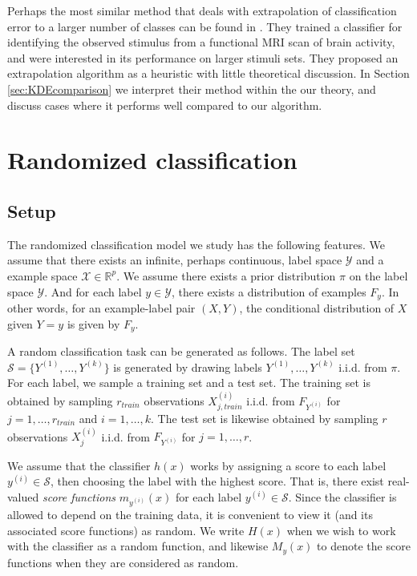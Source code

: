 \documentclass[twoside,11pt]{article}
\begin{document}
Perhaps the most similar method that deals with extrapolation of classification error to a larger number of classes can be found in \cite{Kay2008a}. They trained a classifier for identifying the observed stimulus from a functional MRI scan of brain activity, and were interested in its performance on larger stimuli sets. They proposed an extrapolation algorithm as a heuristic with little theoretical discussion. In Section \ref{sec:KDEcomparison} we interpret their method within the our theory, and discuss cases where it performs well compared to our algorithm.



\section{Randomized classification}\label{sec:rc_motivation}


\subsection{Setup}

The randomized classification model we study has the following
features.  We assume that there exists an infinite, perhaps
continuous, label space $\mathcal{Y}$ and a example space $\mathcal{X}
\in \mathbb{R}^p$.  We assume there exists a prior distribution $\pi$
on the label space $\mathcal{Y}$.  And for each label $y \in
\mathcal{Y}$, there exists a distribution of examples $F_y$. In other
words, for an example-label pair $(X, Y)$, the conditional
distribution of $X$ given $Y = y$ is given by $F_y$.

A random classification task can be generated as follows.  The label
set $\mathcal{S} = \{Y^{(1)},\hdots, Y^{(k)}\}$ is generated by
drawing labels $Y^{(1)},\hdots, Y^{(k)}$ i.i.d. from $\pi$.  For each
label, we sample a training set and a test set.  The training set is
obtained by sampling $r_{train}$ observations $X_{j, train}^{(i)}$
i.i.d. from $F_{Y^{(i)}}$ for $j = 1,\hdots, r_{train}$ and $i =
1,\hdots, k$.  The test set is likewise obtained by sampling $r$
observations $X_j^{(i)}$ i.i.d. from $F_{Y^{(i)}}$ for $j = 1,\hdots,
r$.

We assume that the classifier $h(x)$ works by assigning a score to
each label $y^{(i)} \in \mathcal{S}$, then choosing the label with the
highest score.  That is, there exist real-valued \emph{score
  functions} $m_{y^{(i)}}(x)$ for each label $y^{(i)} \in
\mathcal{S}$.  Since the classifier is allowed to depend on the
training data, it is convenient to view it (and its associated score
functions) as random.  We write $H(x)$ when we wish to work with the
classifier as a random function, and likewise $M_y(x)$ to denote the
score functions when they are considered as random.
\end{document}
